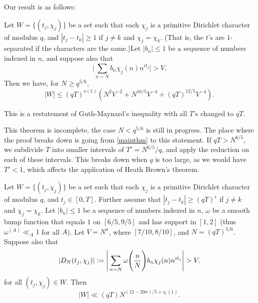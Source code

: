 Our result is as follows: 
\begin{theorem}\label{incompletehybrid}
	Let $W=\{(t_j,\chi_j)\}$ be a set such that each $\chi_j$ is a primitive Dirichlet character of modulus $q$, and $|t_j-t_k|\geq 1$ if $j\neq k$ and $\chi_j=\chi_k$. (That is, the $t$'s are $1$-separated if the characters are the same.)Let $|b_n|\leq 1$ be a sequence of numbers indexed in $n$, and suppose also that \[
	\Bigg|\sum_{n\sim N} b_n\chi_j(n)n^{it_j} \Bigg|>V.
	\]
Then we have, for $N\geq q^{5/6}$, \[
	|W|\leq (qT)^{o(1)}(N^2V^{-2}+ N^{18/5}V^{-4}+(qT)^{12/5}V^{-4} ).
	\]
\end{theorem}
\begin{remark}
This is a restatement of Guth-Maynard's inequality with all $T$'s changed to $qT$.

This theorem is incomplete, the case $N<q^{5/6}$ is still in progress. The place where the proof breaks down is going from \ref{mainthm} to this statement. If $qT>N^{6/5}$, we subdivide $T$ into smaller intervals of $T'=N^{6/5}/q$, and apply the reduction on each of these intervals. This breaks down when $q$ is too large, as we would have $T'< 1$, which affects the application of Heath Brown's theorem.
\end{remark}
\begin{proposition}\label{mainthm}
    Let $W=\{(t_j,\chi_j)\}$ be a set such that each $\chi_j$ is a primitive Dirichlet character of modulus $q$, and $t_j\in[0,T]$. Further assume that $|t_j-t_k|\geq (qT)^\epsilon$ if $j\neq k$ and $\chi_j=\chi_k$. Let $|b_n|\leq 1$ be a sequence of numbers indexed in $n$, $\omega$ be a smooth bump function that equals $1$ on $[6/5,9/5]$ and has support in $[1,2]$ (thus $\omega^{(A)}\ll_A 1$ for all $A$). Let $V=N^{\sigma}$, where $[7/10,8/10]$, and $N=(qT)^{5/6}$. Suppose also that \[
    |D_N(t_j,\chi_j)|\defeq\Bigg|\sum_{n\sim N} \omega\Bigg(\frac{n}{N}\Bigg)b_n\chi_j(n)n^{it_j} \Bigg|>V.
\]
for all $(t_j,\chi_j)\in W$.
Then \[
|W|\ll (qT)N^{(12-20\sigma)/5+o_{\epsilon}(1)}.
\]
\end{proposition}
